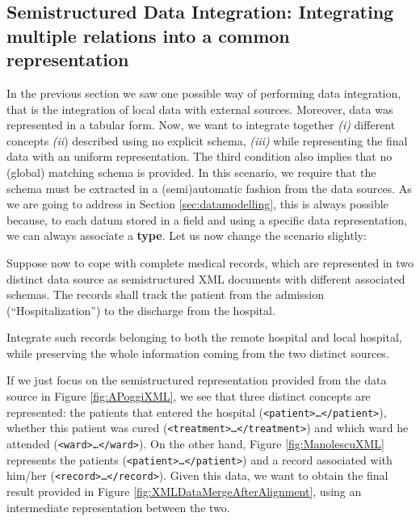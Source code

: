 \subsection{Semistructured Data Integration: Integrating multiple relations into a common representation}\label{sec:SDIIMRIACR}
In the previous section we saw one possible way of performing data integration, that is the integration of local data with external sources. Moreover, data was represented in a tabular form. Now, 
we want to integrate together \textit{(i)} different concepts \textit{(ii}) described using no explicit schema, \textit{(iii)} while representing the final data with an uniform representation. The third condition also implies that no (global) matching schema is provided. In this scenario, we require that the schema must be extracted in a (semi)automatic fashion from the data sources. As we are going to address in Section \ref{sec:datamodelling}, this is always possible because, to each datum stored in a field and using a specific data representation, we can always associate a \textbf{type}. 
Let us now change the scenario slightly:

\begin{example}
  Suppose now to cope with complete medical records, which are represented in two distinct data source as semistructured XML  documents with different associated schemas. The records shall track the patient from the admission (``Hospitalization'') to the discharge from the hospital. 
  
  Integrate such records belonging to both the remote hospital and  local hospital, while preserving the whole information coming from the two distinct sources.
  
 If we just focus on the semistructured representation provided from the data source in Figure \vref{fig:APoggiXML}, we  see that three distinct concepts are represented: the patients that entered the hospital (\texttt{<patient>\dots </patient>}), whether this patient was cured (\texttt{<treatment>\dots </treatment>}) and which ward he attended (\texttt{<ward>\dots</ward>}). On the other hand, Figure \ref{fig:ManolescuXML}  represents the patients (\texttt{<patient>\dots </patient>}) and a record associated with him/her (\texttt{<record>\dots</record>}). Given this data, we want to obtain the final result provided in Figure \vref{fig:XMLDataMergeAfterAlignment}, using an intermediate representation between the two.
\end{example}



